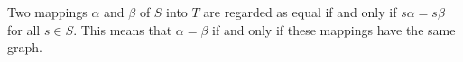 Two mappings $\alpha$ and $\beta$ of $S$ into $T$ are regarded as equal if and only if $s\alpha = s\beta$ for all $s \in S$. This means that $\alpha = \beta$ if and only if these mappings have the same graph.
